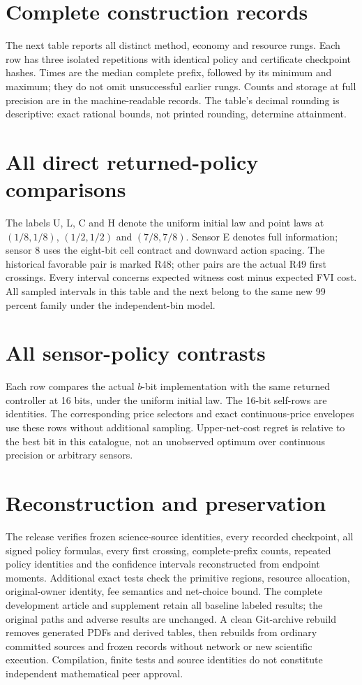 \documentclass[ecta,nameyear,draft]{econsocart}
\begin{document}
\section{Complete construction records}\label{supp:records49}
The next table reports all distinct method, economy and resource rungs. Each row has three isolated repetitions with identical policy and certificate checkpoint hashes. Times are the median complete prefix, followed by its minimum and maximum; they do not omit unsuccessful earlier rungs. Counts and storage at full precision are in the machine-readable records. The table's decimal rounding is descriptive: exact rational bounds, not printed rounding, determine attainment.


\section{All direct returned-policy comparisons}\label{supp:direct49}
The labels U, L, C and H denote the uniform initial law and point laws at $(1/8,1/8)$, $(1/2,1/2)$ and $(7/8,7/8)$. Sensor E denotes full information; sensor 8 uses the eight-bit cell contract and downward action spacing. The historical favorable pair is marked R48; other pairs are the actual R49 first crossings. Every interval concerns expected witness cost minus expected FVI cost. All sampled intervals in this table and the next belong to the same new 99 percent family under the independent-bin model.


\section{All sensor-policy contrasts}\label{supp:sensors49}
Each row compares the actual $b$-bit implementation with the same returned controller at 16 bits, under the uniform initial law. The 16-bit self-rows are identities. The corresponding price selectors and exact continuous-price envelopes use these rows without additional sampling. Upper-net-cost regret is relative to the best bit in this catalogue, not an unobserved optimum over continuous precision or arbitrary sensors.


\section{Reconstruction and preservation}\label{supp:audit49}
The release verifies frozen science-source identities, every recorded checkpoint, all signed policy formulas, every first crossing, complete-prefix counts, repeated policy identities and the confidence intervals reconstructed from endpoint moments. Additional exact tests check the primitive regions, resource allocation, original-owner identity, fee semantics and net-choice bound. The complete development article and supplement retain all baseline labeled results; the original paths and adverse results are unchanged. A clean Git-archive rebuild removes generated PDFs and derived tables, then rebuilds from ordinary committed sources and frozen records without network or new scientific execution. Compilation, finite tests and source identities do not constitute independent mathematical peer approval.
\end{document}
